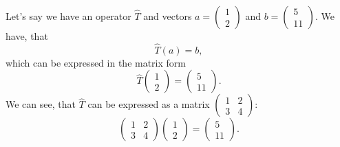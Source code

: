 \begin{example}
Let's say we have an operator $\hat{T}$ and vectors $a = \begin{pmatrix} 1 \\ 2 \end{pmatrix}$ and $b = \begin{pmatrix} 5 \\ 11 \end{pmatrix}$. We have, that
\[ \hat{T}(a) = b, \]
which can be expressed in the matrix form
\[ \hat{T}\begin{pmatrix} 1 \\ 2 \end{pmatrix}  = \begin{pmatrix} 5 \\ 11 \end{pmatrix}.\]
We can see, that $\hat{T}$ can be expressed as a matrix $\begin{pmatrix} 1 & 2 \\ 3 & 4 \end{pmatrix}$:
\[ \begin{pmatrix} 1 & 2 \\ 3 & 4 \end{pmatrix} \begin{pmatrix} 1 \\ 2 \end{pmatrix} = \begin{pmatrix} 5 \\ 11 \end{pmatrix}. \]
\end{example}

